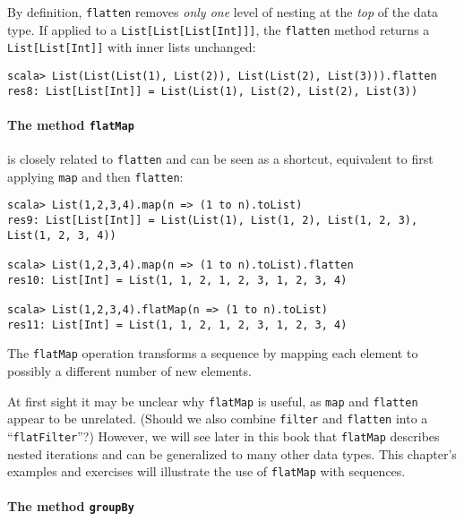 By definition, \lstinline!flatten! removes \emph{only one} level
of nesting at the \emph{top} of the data type. If applied to a \lstinline!List[List[List[Int]]]!,
the \lstinline!flatten! method returns a \lstinline!List[List[Int]]!
with inner lists unchanged:
\begin{lstlisting}
scala> List(List(List(1), List(2)), List(List(2), List(3))).flatten
res8: List[List[Int]] = List(List(1), List(2), List(2), List(3))
\end{lstlisting}


\paragraph*{The method \texttt{flatMap}}

is closely related to \lstinline!flatten! and can be seen as a shortcut,
equivalent to first applying \lstinline!map! and then \lstinline!flatten!:
\begin{lstlisting}
scala> List(1,2,3,4).map(n => (1 to n).toList)
res9: List[List[Int]] = List(List(1), List(1, 2), List(1, 2, 3), List(1, 2, 3, 4))

scala> List(1,2,3,4).map(n => (1 to n).toList).flatten
res10: List[Int] = List(1, 1, 2, 1, 2, 3, 1, 2, 3, 4)

scala> List(1,2,3,4).flatMap(n => (1 to n).toList)
res11: List[Int] = List(1, 1, 2, 1, 2, 3, 1, 2, 3, 4)
\end{lstlisting}
The \lstinline!flatMap! operation transforms a sequence by mapping
each element to possibly a different number of new elements.

At first sight it may be unclear why \lstinline!flatMap! is useful,
as \lstinline!map! and \lstinline!flatten! appear to be unrelated.
(Should we also combine \lstinline!filter! and \lstinline!flatten!
into a \textsf{``}\lstinline!flatFilter!\textsf{''}?) However, we will see later
in this book that \lstinline!flatMap! describes nested iterations
and can be generalized to many other data types. This chapter\textsf{'}s examples
and exercises will illustrate the use of \lstinline!flatMap! with
sequences.

\paragraph*{The method \texttt{groupBy}}

